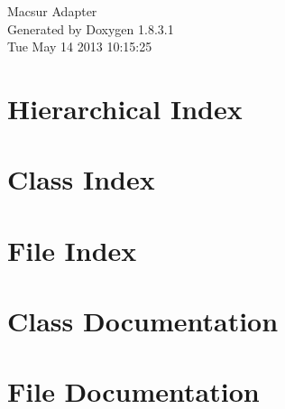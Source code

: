 \documentclass{book}
\begin{document}
\hypersetup{pageanchor=false,citecolor=blue}
\begin{titlepage}
\vspace*{7cm}
\begin{center}
{\Large Macsur Adapter }\\
\vspace*{1cm}
{\large Generated by Doxygen 1.8.3.1}\\
\vspace*{0.5cm}
{\small Tue May 14 2013 10:15:25}\\
\end{center}
\end{titlepage}
\clearemptydoublepage
{}
\tableofcontents
\clearemptydoublepage
{}
\hypersetup{pageanchor=true,citecolor=blue}
\chapter{Hierarchical Index}

\chapter{Class Index}

\chapter{File Index}

\chapter{Class Documentation}









\chapter{File Documentation}

















\printindex
\end{document}
